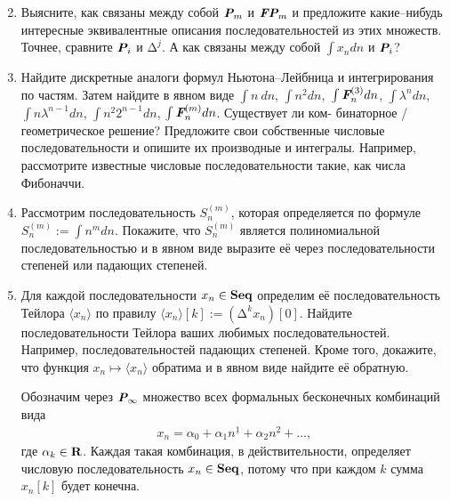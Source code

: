\begin{enumerate}
\setcounter{enumi}{1}
\item Выясните, как связаны между собой $\text{\bfseries\itshape P}_m$ и $\text{\bfseries\itshape FP}_m$ и предложите какие--нибудь интересные эквивалентные описания последовательностей из этих множеств. Точнее, сравните $\text{\bfseries\itshape P}_i$ и $\text{Δ}^{j}$. А как связаны между собой $\int x_n dn$ и $\text{\bfseries\itshape P}_i$? 
\item Найдите дискретные аналоги формул Ньютона--Лейбница и интегрирования по частям. Затем найдите в явном виде $\int n\ dn$, $\int n^2 dn,$
$\int \text{\bfseries\itshape F}_n^{(3)} dn$,
$\int \lambda^n dn$,
$\int n \lambda^{n-1} dn$,
$\int n^2 \textrm{2}^{n-1} dn$,
$\int \text{\bfseries\itshape F}_n^{(m)} dn$. Существует ли ком- бинаторное / геометрическое решение? Предложите свои собственные числовые последовательности и опишите их производные и интегралы. Например, рассмотрите известные числовые последовательности такие, как числа Фибоначчи.

\item Рассмотрим последовательность $S_n^{(m)}$, которая определяется по формуле $S_n^{(m)} := \int n^m dn$. Покажите, что $S_n^{(m)}$ является полиномиальной последовательностью и в явном виде выразите её через последовательности степеней или падающих степеней. 

\item Для каждой последовательности $x_n \in \text{\bfseries Seq}$ определим её последовательность Тейлора $\langle x_n \rangle$ по правилу $\langle x_n \rangle [k] := (\text{Δ}^k x_n)[0]$. Найдите последовательности Тейлора ваших любимых последовательностей. Например, последовательностей падающих степеней. Кроме того, докажите, что функция $x_n \mapsto \langle x_n \rangle$ обратима и в явном виде найдите её обратную.

Обозначим через $\text{\bfseries\itshape P}_\infty$ множество всех формальных бесконечных комбинаций вида
\begin{align*}
x_n = \alpha_0 + \alpha_1 n^{\underline{1}} + \alpha_2 n^{\underline{2}} + \ldots,
\end{align*}
где $\alpha_k \in \text{\bfseries R}$. Каждая такая комбинация, в действительности, определяет числовую последовательность $x_n \in \text{\bfseries Seq}$, потому что при каждом $k$ сумма $x_n[k]$ будет конечна.


\end{enumerate}
